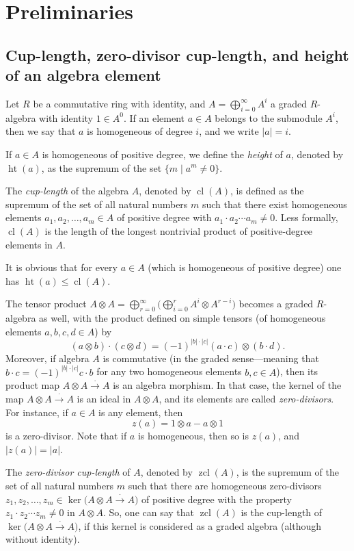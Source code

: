 \documentclass{amsart}
\theoremstyle{definition}
\theoremstyle{remark}
\numberwithin{equation}{section}
\newcommand{\htt}{\operatorname{ht}}
\newcommand{\cl}{\operatorname{cl}}
\newcommand{\zcl}{\operatorname{zcl}}
\renewcommand{\le}{\leqslant}
\begin{document}
\section{Preliminaries}
\label{sec:2}

\subsection{Cup-length, zero-divisor cup-length, and height of an algebra element}

Let $R$ be a commutative ring with identity, and $A=\bigoplus_{i=0}^\infty A^i$ a graded $R$-algebra with identity $1\in A^0$. If an element $a\in A$ belongs to the submodule $A^i$, then we say that $a$ is homogeneous of degree $i$, and we write $|a|=i$.

If $a\in A$ is homogeneous of positive degree, we define the {\it height} of $a$, denoted by $\htt(a)$, as the supremum of the set $\{m\mid a^m\neq0\}$.

The {\it cup-length} of the algebra $A$, denoted by $\cl(A)$, is defined as the supremum of the set of all natural numbers $m$ such that there exist homogeneous elements $a_1,a_2,\ldots,a_m\in A$ of positive degree with $a_1\cdot a_2\cdots a_m\neq0$. Less formally, $\cl(A)$ is the length of the longest nontrivial product of positive-degree elements in $A$.

It is obvious that for every $a\in A$ (which is homogeneous of positive degree) one has $\htt(a)\le\cl(A)$.

\medskip

The tensor product $A\otimes A=\bigoplus_{r=0}^\infty\big(\bigoplus_{i=0}^rA^i\otimes A^{r-i}\big)$ becomes a graded $R$-algebra as well, with the product defined on simple tensors (of homogeneous elements $a,b,c,d\in A$) by
\[(a\otimes b)\cdot(c\otimes d)=(-1)^{|b|\cdot|c|}(a\cdot c)\otimes(b\cdot d).\]
Moreover, if algebra $A$ is commutative (in the graded sense---meaning that $b\cdot c=(-1)^{|b|\cdot|c|}c\cdot b$ for any two homogeneous elements $b,c\in A$), then its product map $A\otimes A\stackrel{\cdot}\longrightarrow A$ is an algebra morphism. In that case, the kernel of the map $A\otimes A\stackrel{\cdot}\longrightarrow A$ is an ideal in $A\otimes A$, and its elements are called {\it zero-divisors}. For instance, if $a\in A$ is any element, then
\[z(a)=1\otimes a-a\otimes1\]
is a zero-divisor. Note that if $a$ is homogeneous, then so is $z(a)$, and $|z(a)|=|a|$.

The {\it zero-divisor cup-length} of $A$, denoted by $\zcl(A)$, is the supremum of the set of all natural numbers $m$ such that there are homogeneous zero-divisors $z_1,z_2,\ldots,z_m\in\ker\big(A\otimes A\stackrel{\cdot}\longrightarrow A\big)$ of positive degree with the property $z_1\cdot z_2\cdots z_m\neq0$ in $A\otimes A$. So, one can say that $\zcl(A)$ is the cup-length of $\ker\big(A\otimes A\stackrel{\cdot}\longrightarrow A\big)$, if this kernel is considered as a graded algebra (although without identity).
\end{document}
